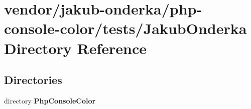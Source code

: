 \section{vendor/jakub-\/onderka/php-\/console-\/color/tests/\+Jakub\+Onderka Directory Reference}
\label{dir_a4fdd05e5b2f1dd4f38855f7a8916166}
\subsection*{Directories}
\begin{DoxyCompactItemize}
\item 
directory {\bf Php\+Console\+Color}
\end{DoxyCompactItemize}
